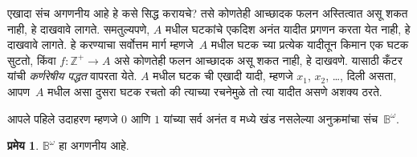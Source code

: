 \documentclass[11pt,a4paper,openany]{book}
\theoremstyle{definition}
\newtheorem{thm}[defn]{प्रमेय}
\newcommand{\PosInt}{\mathbb{Z}^{+}}
\newcommand{\Bin}{\mathbb{B}}
\begin{document}
एखादा संच अगणनीय आहे हे कसे सिद्ध करायचे? तसे कोणतेही
आच्छादक फलन अस्तित्वात असू शकत नाही, हे दाखवावे लागते. समतुल्यपणे,
$A$ मधील घटकांचे एकदिश अनंत यादीत प्रगणन करता येत नाही, हे दाखवावे
लागते. हे करण्याचा सर्वोत्तम मार्ग म्हणजे~$A$ मधील घटक च्या
प्रत्येक यादीतून किमान एक घटक सुटतो, किंवा $f\colon \PosInt \to A$
असे कोणतेही फलन आच्छादक असू शकत नाही, हे दाखवणे. यासाठी कँटर
यांची \emph{कर्णरेषीय पद्धत} वापरता येते. $A$ मधील घटक ची
एखादी यादी, म्हणजे $x_1$, $x_2$, \dots, दिली असता, आपण~$A$ मधील असा
दुसरा घटक रचतो की त्याच्या रचनेमुळे तो त्या यादीत असणे अशक्य ठरते.

आपले पहिले उदाहरण म्हणजे $0$ आणि $1$ यांच्या सर्व अनंत व मध्ये खंड
नसलेल्या अनुक्रमांचा संच~$\Bin^\omega$.

\begin{thm}
\label{sfr:siz:nen:thm:nonenum-bin-omega}
$\Bin^\omega$ हा अगणनीय आहे.
\end{thm}
\end{document}
